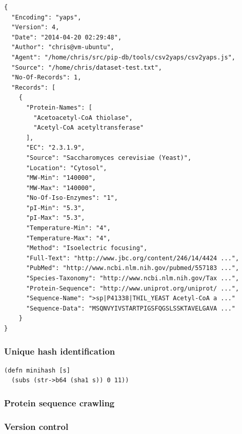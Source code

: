 \lstset{language=JavaScript}
\begin{lstlisting}[label=lst:yaps-example,caption={%
      [Example YAPS encoded dataset]
      An example YAPS encoded dataset, containing a single record.}]
{
  "Encoding": "yaps",
  "Version": 4,
  "Date": "2014-04-20 02:29:48",
  "Author": "chris@vm-ubuntu",
  "Agent": "/home/chris/src/pip-db/tools/csv2yaps/csv2yaps.js",
  "Source": "/home/chris/dataset-test.txt",
  "No-Of-Records": 1,
  "Records": [
    {
      "Protein-Names": [
        "Acetoacetyl-CoA thiolase",
        "Acetyl-CoA acetyltransferase"
      ],
      "EC": "2.3.1.9",
      "Source": "Saccharomyces cerevisiae (Yeast)",
      "Location": "Cytosol",
      "MW-Min": "140000",
      "MW-Max": "140000",
      "No-Of-Iso-Enzymes": "1",
      "pI-Min": "5.3",
      "pI-Max": "5.3",
      "Temperature-Min": "4",
      "Temperature-Max": "4",
      "Method": "Isoelectric focusing",
      "Full-Text": "http://www.jbc.org/content/246/14/4424 ...",
      "PubMed": "http://www.ncbi.nlm.nih.gov/pubmed/557183 ...",
      "Species-Taxonomy": "http://www.ncbi.nlm.nih.gov/Tax ...",
      "Protein-Sequence": "http://www.uniprot.org/uniprot/ ...",
      "Sequence-Name": ">sp|P41338|THIL_YEAST Acetyl-CoA a ..."
      "Sequence-Data": "MSQNVYIVSTARTPIGSFQGSLSSKTAVELGAVA ..."
    }
}
\end{lstlisting}

\subsubsection*{Unique hash identification}


\lstset{language=Clojure}
\begin{lstlisting}[label=lst:minihash,caption={%
      [String hashing implementation]
      String hashing implementation, taken from \texttt{util.clj}.}]
(defn minihash [s]
  (subs (str->b64 (sha1 s)) 0 11))
\end{lstlisting}


\subsubsection*{Protein sequence crawling}



\subsubsection*{Version control}

